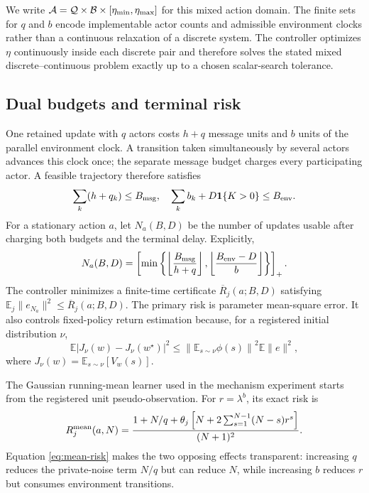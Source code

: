\documentclass[journal]{IEEEtran}
\newcommand{\E}{\mathbb{E}}
\newcommand{\A}{\mathcal{A}}
\begin{document}
We write $\A={\cal Q}\times{\cal B}\times[\eta_{\min},\eta_{\max}]$ for this mixed action domain.
The finite sets for $q$ and $b$ encode implementable actor counts and admissible environment clocks rather than a continuous relaxation of a discrete system.
The controller optimizes $\eta$ continuously inside each discrete pair and therefore solves the stated mixed discrete--continuous problem exactly up to a chosen scalar-search tolerance.

\subsection{Dual budgets and terminal risk}
One retained update with $q$ actors costs $h+q$ message units and $b$ units of the parallel environment clock.
A transition taken simultaneously by several actors advances this clock once; the separate message budget charges every participating actor.
A feasible trajectory therefore satisfies
\begin{equation}
\sum_k(h+q_k)\le B_{\rm msg},
\quad
\sum_k b_k+D\mathbf{1}\{K>0\}\le B_{\rm env}.
\label{eq:budgets}
\end{equation}
For a stationary action $a$, let $N_a(B,D)$ be the number of updates usable after charging both budgets and the terminal delay.
Explicitly,
\begin{equation}
N_a(B,D)=\left[\min\left\{\left\lfloor\frac{B_{\rm msg}}{h+q}\right\rfloor,
\left\lfloor\frac{B_{\rm env}-D}{b}\right\rfloor\right\}\right]_+.
\label{eq:usable-horizon}
\end{equation}
The controller minimizes a finite-time certificate $\overline R_j(a;B,D)$ satisfying $\E_j\|e_{N_a}\|^2\le\overline R_j(a;B,D)$.
The primary risk is parameter mean-square error.
It also controls fixed-policy return estimation because, for a registered initial distribution $\nu$,
\begin{equation}
\E\left|J_\nu(w)-J_\nu(w^\star)\right|^2
\le \left\|\E_{s\sim\nu}\phi(s)\right\|^2\E\|e\|^2,
\label{eq:return-transfer}
\end{equation}
where $J_\nu(w)=\E_{s\sim\nu}[V_w(s)]$.

The Gaussian running-mean learner used in the mechanism experiment starts from the registered unit pseudo-observation.
For $r=\lambda^b$, its exact risk is
\begin{equation}
R_j^{\rm mean}(a,N)=
\frac{1+N/q+\theta_j\left[N+2\sum_{s=1}^{N-1}(N-s)r^s\right]}{(N+1)^2}.
\label{eq:mean-risk}
\end{equation}
Equation \eqref{eq:mean-risk} makes the two opposing effects transparent: increasing $q$ reduces the private-noise term $N/q$ but can reduce $N$, while increasing $b$ reduces $r$ but consumes environment transitions.
\end{document}
